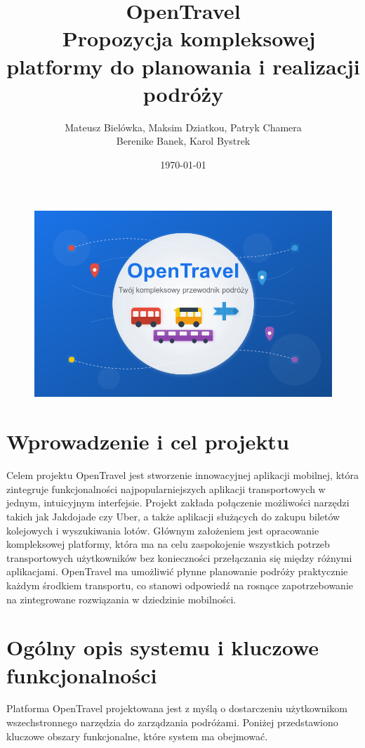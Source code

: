 \documentclass[a4paper,12pt]{article}
\title{\textbf{OpenTravel}\\\
\large{Propozycja kompleksowej platformy do planowania i realizacji podróży}}
\author{Mateusz Bielówka, Maksim Dziatkou, Patryk Chamera
\\ Berenike Banek, Karol Bystrek}
\date{\today}
\begin{document}
\maketitle

\begin{figure}[H]
    \centering
    \includegraphics[width=\linewidth]{images/logo.png}
    \label{fig:logo}
\end{figure}

\newpage

\tableofcontents
\newpage

\section*{Wprowadzenie i cel projektu}
Celem projektu OpenTravel jest stworzenie innowacyjnej aplikacji mobilnej, która zintegruje funkcjonalności najpopularniejszych aplikacji transportowych w jednym, intuicyjnym interfejsie.
Projekt zakłada połączenie możliwości narzędzi takich jak Jakdojade czy Uber, a także aplikacji służących do zakupu biletów kolejowych i wyszukiwania lotów.
Głównym założeniem jest opracowanie kompleksowej platformy, która ma na celu zaspokojenie wszystkich potrzeb transportowych użytkowników bez konieczności przełączania się między różnymi aplikacjami.
OpenTravel ma umożliwić płynne planowanie podróży praktycznie każdym środkiem transportu, co stanowi odpowiedź na rosnące zapotrzebowanie na zintegrowane rozwiązania w dziedzinie mobilności.

\section{Ogólny opis systemu i kluczowe funkcjonalności}
Platforma OpenTravel projektowana jest z myślą o dostarczeniu użytkownikom wszechstronnego narzędzia do zarządzania podróżami. Poniżej przedstawiono kluczowe obszary funkcjonalne, które system ma obejmować.
\end{document}
